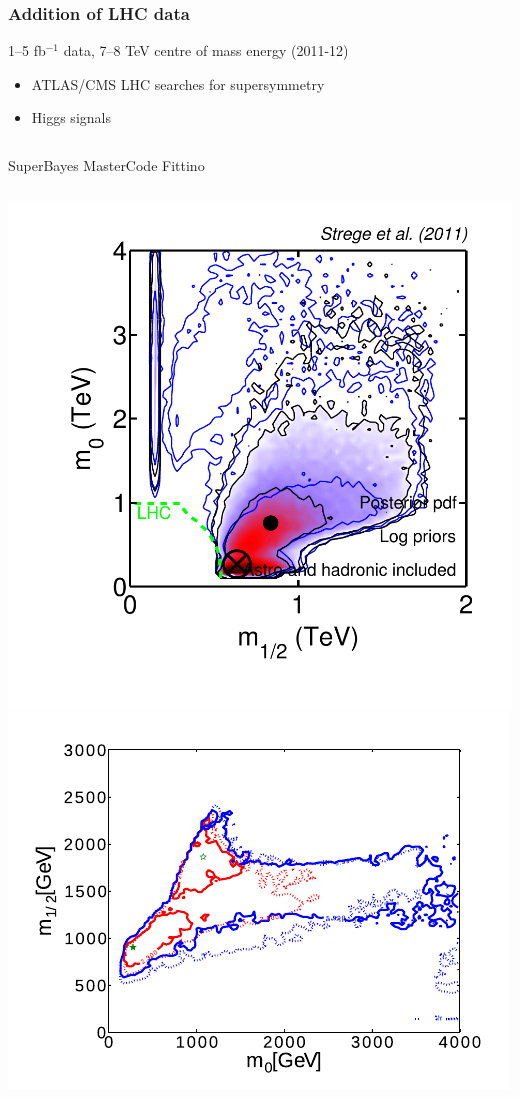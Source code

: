 \documentclass[xcolor=dvipsnames]{beamer}
\begin{document}
\begin{frame}
\frametitle{Addition of LHC data}

1--5 fb$^{-1}$ data, 7--8 TeV centre of mass energy (2011-12)
\begin{itemize}
  \item ATLAS/CMS LHC searches for supersymmetry 
  \item Higgs signals
\end{itemize}
\vspace{8mm}

\begin{columns}
\centering
SuperBayes
\centering
MasterCode
\centering
Fittino
\end{columns}

\begin{columns}
\centering
\includegraphics[width=\textwidth]{Strege11}
\centering
\includegraphics[width=\textwidth]{MasterCode2012_CMSSM}

\end{columns}
\end{frame}
\end{document}
